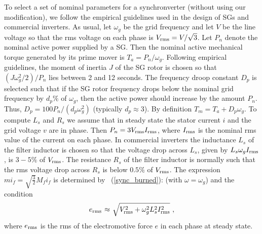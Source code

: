 \documentclass[12pt]{article}
\theoremstyle{definition}
\numberwithin{equation}{section}                        %
\newcommand{\BE}{\begin{equation}}
\newcommand{\BEQ}[1]{\BE\mathlabel{#1}} %
\newcommand{\rfb}[1]{\mbox{\rm
   (\ref{#1})}\ifx\undefined\stillediting\else:\fbox{$#1$}\fi}
\newcommand{\m}      {{\hbox{\hskip 1pt}}}
\renewcommand{\o}    {{\omega}}
\let\oldlabel=\label
\renewcommand{\label}[1]{\leavevmode\smash{\raise 10pt\llap
             {\fbox{\scriptsize#1}}}\oldlabel{#1}}
\newcommand{\mathlabel}[1]{\smash{\raise 9pt\llap
             {\scriptsize(#1)}}\label{#1}}
\renewcommand{\label}[1]{\oldlabel{#1}}
\renewcommand{\mathlabel}[1]{\label{#1}}
\begin{document}
To select a set of nominal parameters for a synchronverter (without
using our modification), we follow the empirical guidelines used in
the design of SGs and commercial inverters. As usual, let $\o_g$ be
the grid frequency and let $V$ be the line voltage so that the rms
voltage on each phase is $V_{\rm rms}=V/\sqrt{3}$. Let $P_n$ denote
the nominal active power supplied by a SG. Then the nominal active
mechanical torque generated by its prime mover is $T_a=P_n/\o_g$.
Following empirical guidelines, the moment of inertia $J$ of the SG
rotor is chosen so that $(J\o_g^2/2)/P_n$ lies between 2 and 12
seconds. The frequency droop constant $D_p$ is selected such
that if the SG rotor frequency drops below the nominal grid frequency
by $d_p\%$ of $\o_g$, then the active power should increase by the
amount $P_n$. Thus, $D_p=100P_n/(d_p\o_g^2)$ (typically $d_p\approx
3$). By definition $T_m=T_a+D_p\o_g$. To compute $L_s$ and $R_s$ we
assume that in steady state the stator current $i$ and the grid
voltage $v$ are in phase. Then $P_n=3V_{\rm rms}I_{\rm rms}$, where
$I_{\rm rms}$ is the nominal rms value of the current on each
phase. In commercial inverters the inductance $L_s$ of the filter
inductor is chosen so that the voltage drop across $L_s$, given
by $L_s\o_g I_{\rm rms}$, is $3-5\%$ of $V_{\rm rms}$. The resistance
$R_s$ of the filter inductor is normally such that the rms voltage
drop across $R_s$ is below $0.5\%$ of $V_{\rm rms}$. The expression
$mi_f=\sqrt{\frac{3}{2}} M_fi_f$ is determined by \rfb{sync_burned}
(with $\o=\o_g$) and the condition \vspace{-2mm}
\BEQ{mif_inc}
   e_{\rm rms} \m\approx\m \sqrt{V_{\rm rms}^2+\o_g^2 L_s^2 I_{\rm
   rms}^2} \ , \vspace{-1mm}
\end{equation}
where $e_{\rm rms}$ is the rms of the electromotive force $e$
in each phase at steady state.
\end{document}
